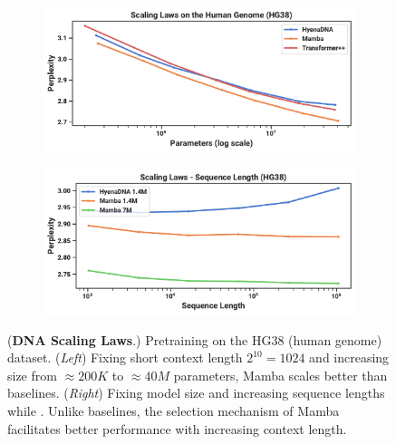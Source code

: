 \begin{figure}[!t]
  \centering
\begin{subfigure}{.49\linewidth}%
  \centering
  \includegraphics[width=\linewidth]{fig/dna_scaling.pdf}
\end{subfigure}
\begin{subfigure}{.49\linewidth}%
  \centering
  \includegraphics[width=\linewidth]{fig/dna_length.pdf}
\end{subfigure}
\caption{
  (\textbf{DNA Scaling Laws}.) Pretraining on the HG38 (human genome) dataset.
  (\textit{Left}) Fixing short context length $2^{10}=1024$ and increasing size from $\approx200K$ to $\approx 40M$ parameters, Mamba scales better than baselines.
  (\textit{Right}) Fixing model size and increasing sequence lengths while \iftoggle{arxiv}{keeping tokens/batch and total training tokens fixed}{controlling for computation}.
  Unlike baselines, the selection mechanism of Mamba facilitates better performance with increasing context length.
}
\label{fig:dna}
\end{figure}


